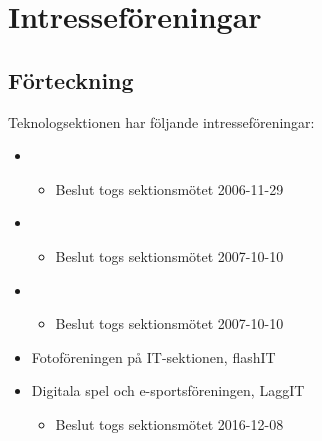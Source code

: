 \section{Intresseföreningar}

\subsection{Förteckning}

Teknologsektionen har följande intresseföreningar:

\begin{itemize}
	\item \EIGHTBITFULL{}
	\begin{itemize}
		\item Beslut togs sektionsmötet 2006-11-29
	\end{itemize}
	\item \DRAWITFULL{}
	\begin{itemize}
		\item Beslut togs sektionsmötet 2007-10-10
	\end{itemize}
	\item \HOOKITFULL{}
	\begin{itemize}
		\item Beslut togs sektionsmötet 2007-10-10
	\end{itemize}
	\item Fotoföreningen på IT-sektionen, flashIT
	\item Digitala spel och e-sportsföreningen, LaggIT
	\begin{itemize}
		\item Beslut togs sektionsmötet 2016-12-08
	\end{itemize}
\end{itemize}